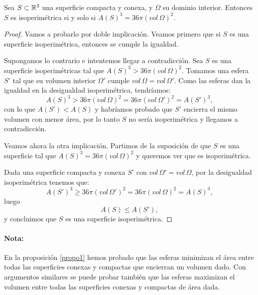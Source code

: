 \begin{corolario}
Sea $S \subset \mathbb{R}^3$ una superficie compacta y conexa, y $\Omega$ su dominio interior. Entonces $S$ es isoperimétrica si y solo si $A(S)^3 = 36\pi (vol \, \Omega)^2$.
\end{corolario}
\begin{proof}
Vamos a probarlo por doble implicación. Veamos primero que si $S$ es una superficie isoperimétrica, entonces se cumple la igualdad.

Supongamos lo contrario e intentemos llegar a contradicción. Sea $S$ es una superficie isoperimétricas tal que $A(S)^3 > 36\pi (vol \, \Omega)^2$. Tomamos una esfera $S'$ tal que su volumen interior $\Omega'$ cumple $vol \, \Omega = vol \, \Omega'$. Como las esferas dan la igualdad en la desigualdad isoperimétrica, tendríamos:
%
\begin{equation*}
    A(S)^3 > 36\pi (vol \, \Omega)^2 = 36\pi (vol \, \Omega')^2 = A(S')^3,
\end{equation*}
%
con lo que $A(S') < A(S)$ y habríamos probado que $S'$ encierra el mismo volumen con menor área, por lo tanto $S$ no sería isoperimétrica y llegamos a contradicción.

Veamos ahora la otra implicación. Partimos de la suposición de que $S$ es una superficie tal que $A(S)^3 = 36\pi (vol \, \Omega)^2$ y queremos ver que es isoperimétrica.

Dada una superficie compacta y conexa $S'$ con $vol \, \Omega' = vol \, \Omega$, por la desigualdad isoperimétrica tenemos que:
%
\begin{equation*}
    A(S')^3 \geq 36\pi (vol \, \Omega')^2 = 36\pi(vol \, \Omega)^2 = A(S)^3,
\end{equation*}
%
luego
%
\begin{equation*}
    A(S) \leq A(S'),
\end{equation*}
%
y concluimos que $S$ es una superficie isoperimétrica.
\end{proof}

\paragraph{Nota:} En la proposición \ref{propo1} hemos probado que las esferas minimizan el área entre todas las superficies conexas y compactas que encierran un volumen dado. Con argumentos similares se puede probar también que las esferas maximizan el volumen entre todas las superficies conexas y compactas de área dada.

